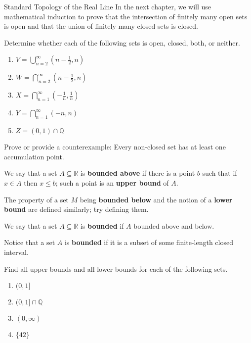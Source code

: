 \begin{section}{Standard Topology of the Real Line}
In the next chapter, we will use mathematical induction to prove that the intersection of finitely many open sets is open and that the union of finitely many closed sets is closed.

\begin{problem}
Determine whether each of the following sets is open, closed, both, or neither.
\begin{enumerate}[label=\textrm{(\alph*)}]
\item $\displaystyle V=\bigcup_{n=2}^{\infty} \left(n - \frac{1}{2},n\right)$
\item $\displaystyle W=\bigcap_{n=2}^{\infty} \left(n - \frac{1}{2},n\right)$
\item $\displaystyle X=\bigcap_{n=1}^{\infty} \left(-\frac{1}{n}, \frac{1}{n}\right)$
\item $\displaystyle Y=\bigcap_{n=1}^{\infty} \left(-n, n\right)$
\item $Z=(0,1)\cap \mathbb{Q}$
\end{enumerate}
\end{problem}

\begin{problem}
Prove or provide a counterexample: Every non-closed set has at least one accumulation point.
\end{problem}

\begin{definition}
We say that a set $A\subseteq \mathbb{R}$ is \textbf{bounded above} if there is a point $b$ such that if $x\in A$ then $x\leq b$; such a point is an \textbf{upper bound} of $A$.
\end{definition}

\begin{problem}
The property of a set $M$ being \textbf{bounded below} and the notion of a \textbf{lower bound} are defined similarly; try defining them.
\end{problem}

\begin{definition}
We say that a set $A\subseteq \mathbb{R}$ is \textbf{bounded} if $A$ bounded above and below.
\end{definition}

Notice that a set $A$ is \textbf{bounded} if it is a subset of some finite-length closed interval.

\begin{problem}\label{prob:find upper bounds}
Find all upper bounds and all lower bounds for each of the following sets.
\begin{enumerate}[label=\textrm{(\alph*)}]
\item $(0,1]$
\item $(0,1]\cap \mathbb{Q}$
\item $(0,\infty)$
\item $\{42\}$
\end{enumerate}
\end{problem}


\end{section}

